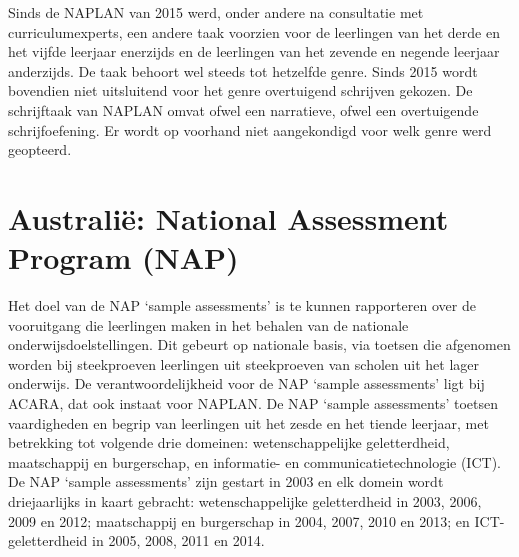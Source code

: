 \documentclass[
  letterpaper,
]{report}
\begin{document}
Sinds de NAPLAN van 2015 werd, onder andere na consultatie met
curriculumexperts, een andere taak voorzien voor de leerlingen van het
derde en het vijfde leerjaar enerzijds en de leerlingen van het zevende
en negende leerjaar anderzijds. De taak behoort wel steeds tot hetzelfde
genre. Sinds 2015 wordt bovendien niet uitsluitend voor het genre
overtuigend schrijven gekozen. De schrijftaak van NAPLAN omvat ofwel een
narratieve, ofwel een overtuigende schrijfoefening. Er wordt op voorhand
niet aangekondigd voor welk genre werd geopteerd.

\hypertarget{australiuxeb-national-assessment-program-nap}{%
\section{Australië: National Assessment Program
(NAP)}\label{australiuxeb-national-assessment-program-nap}}

Het doel van de NAP `sample assessments' is te kunnen rapporteren over
de vooruitgang die leerlingen maken in het behalen van de nationale
onderwijsdoelstellingen. Dit gebeurt op nationale basis, via toetsen die
afgenomen worden bij steekproeven leerlingen uit steekproeven van
scholen uit het lager onderwijs. De verantwoordelijkheid voor de NAP
`sample assessments' ligt bij ACARA, dat ook instaat voor NAPLAN. De NAP
`sample assessments' toetsen vaardigheden en begrip van leerlingen uit
het zesde en het tiende leerjaar, met betrekking tot volgende drie
domeinen: wetenschappelijke geletterdheid, maatschappij en burgerschap,
en informatie- en communicatietechnologie (ICT). De NAP `sample
assessments' zijn gestart in 2003 en elk domein wordt driejaarlijks in
kaart gebracht: wetenschappelijke geletterdheid in 2003, 2006, 2009 en
2012; maatschappij en burgerschap in 2004, 2007, 2010 en 2013; en
ICT-geletterdheid in 2005, 2008, 2011 en 2014.
\end{document}
